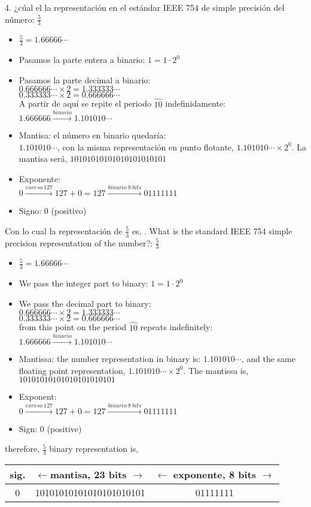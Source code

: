 \begin{paracol}{2}
4. ¿cúal el la representación en el estándar IEEE 754 de simple precisión del número: $\frac{5}{3}$
\begin{itemize}[leftmargin=\dimexpr 26pt-.25in]
\item $\frac{5}{3}=1.66666\cdots$
\item Pasamos la parte entera a binario: $1=1\cdot 2^0$
\item Pasamos la parte decimal a binario:\\
$0.666666\cdots\times 2=1.333333\cdots$\\
$0.333333\cdots\times 2=0.666666\cdots$\\
A partir de aquí se repite el periodo $\widehat{10}$ indefinidamente: $1.666666  \xrightarrow{binario} 1.101010\cdots$ 
\item Mantisa: el número en binario quedaría:\\
$1.101010 \cdots$, con la misma representación en punto flotante, $1.101010\cdots \times 2^0$. La mantisa será, $10101010101010101010101$

\item Exponente:\\
$0 \xrightarrow{exceso\ 127} 127+0=127  \xrightarrow{binario \ 8 \ bits} 01111111$
\item Signo: 0 (positivo)
\end{itemize}
Con lo cual la representación de $\frac{5}{3}$ es,
. What is the standard IEEE 754 simple precision representation of  the number?: $\frac{5}{3}$
\begin{itemize}[leftmargin=\dimexpr 26pt-.25in]
\item $\frac{5}{3}=1.66666\cdots$
\item We pass the integer part to binary: $1=1\cdot 2^0$
\item We pass the decimal part to binary:\\
$0.666666\cdots\times 2=1.333333\cdots$\\
$0.333333\cdots\times 2=0.666666\cdots$\\
from this point on the period $\widehat{10}$ repeats indefinitely: $1.666666  \xrightarrow{binario} 1.101010\cdots$ 
\item Mantissa: the number representation in binary is: $1.101010 \cdots$, and the same floating point representation, $1.101010\cdots \times 2^0$. The mantissa is, $10101010101010101010101$

\item Exponent:\\
$0 \xrightarrow{exceso\ 127} 127+0=127  \xrightarrow{binario \ 8 \ bits} 01111111$
\item Sign: 0 (positive)
\end{itemize}
therefore, $\frac{5}{3}$ binary representation is,
\end{paracol}
\begin{tabular}{|c||c||c|}
\hline
sig.&$\leftarrow$mantisa, 23 bits $\rightarrow$&$\leftarrow$ exponente, 8 bits $\rightarrow$\\
\hline
0&10101010101010101010101&01111111\\
\hline
\end{tabular}\\

